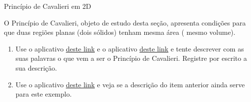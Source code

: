 \label{\detokenize{GE504-8:explorando-principio-de-cavalieri}}\label{\detokenize{GE504-8::doc}}
\begin{task}{Princípio de Cavalieri em 2D}



O Princípio de Cavalieri, objeto de estudo desta seção, apresenta condições para que duas regiões planas (dois sólidos) tenham mesma área ( mesmo volume).
\begin{enumerate}
\item {} 
Use o aplicativo \href{https://ggbm.at/bxrxatwv}{deste link} e o aplicativo \href{https://ggbm.at/gkh7g4y5}{deste link} e tente descrever com as suas palavras o que vem a ser o Princípio de Cavalieri. Registre por escrito a sua descrição.

\item {} 
Use o aplicativo \href{https://ggbm.at/rqpdcc33}{deste link} e veja se a descrição do item anterior ainda serve para este exemplo.

\end{enumerate}
\end{task}

